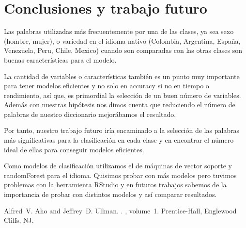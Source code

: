 \documentclass[11pt,a4paper]{article}
\begin{document}
\section{Conclusiones y trabajo futuro}
\justify
Las palabras utilizadas m\'as frecuentemente por una de las clases, ya sea sexo (hombre, mujer), o variedad en el idioma nativo (Colombia, Argentina, España, Venezuela, Peru, Chile, Mexico) cuando son comparadas con las otras clases son buenas caracter\'isticas para el modelo. \par\noindent
La cantidad de variables o caracter\'isticas tambi\'en es un punto muy importante para tener modelos eficientes y no solo en accuracy si no en tiempo o rendimiento, as\'i que, es primordial la selecci\'on de un buen n\'umero de variables. Adem\'as con nuestras hip\'otesis nos dimos cuenta que reduciendo el n\'umero de palabras de nuestro diccionario mejor\'abamos el resultado. \par\noindent
Por tanto, nuestro trabajo futuro ir\'ia encaminado a la selecci\'on de las palabras m\'as significativas para la clasificaci\'on en cada clase y en encontrar el n\'umero ideal de ellas para conseguir modelos eficientes. \par\noindent
Como modelos de clasificaci\'on utilizamos el de m\'aquinas de vector soporte y randomForest para el idioma. Quisimos probar con m\'as modelos pero tuvimos problemas con la herramienta RStudio y en futuros trabajos sabemos de la importancia de probar con distintos modelos y as\'i comparar resultados. 


\begin{thebibliography}{}
Alfred~V. Aho and Jeffrey~D. Ullman.
.
, volume~1.
\newblock Prentice-{Hall}, Englewood Cliffs, NJ.

\end{thebibliography}
\end{document}
